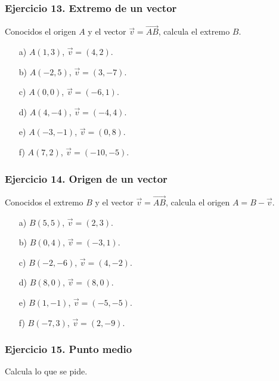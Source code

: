 \subsubsection*{Ejercicio 13. Extremo de un vector}

Conocidos el origen $A$ y el vector $\vec{v}=\overrightarrow{AB}$, calcula el extremo $B$.

\begin{enumerate}
    \item[a)] $A(1,3)$, $\vec{v}=(4,2)$.
    \item[b)] $A(-2,5)$, $\vec{v}=(3,-7)$.
    \item[c)] $A(0,0)$, $\vec{v}=(-6,1)$.
    \item[d)] $A(4,-4)$, $\vec{v}=(-4,4)$.
    \item[e)] $A(-3,-1)$, $\vec{v}=(0,8)$.
    \item[f)] $A(7,2)$, $\vec{v}=(-10,-5)$.
\end{enumerate}

\subsubsection*{Ejercicio 14. Origen de un vector}

Conocidos el extremo $B$ y el vector $\vec{v}=\overrightarrow{AB}$, calcula el origen $A=B-\vec{v}$.

\begin{enumerate}
    \item[a)] $B(5,5)$, $\vec{v}=(2,3)$.
    \item[b)] $B(0,4)$, $\vec{v}=(-3,1)$.
    \item[c)] $B(-2,-6)$, $\vec{v}=(4,-2)$.
    \item[d)] $B(8,0)$, $\vec{v}=(8,0)$.
    \item[e)] $B(1,-1)$, $\vec{v}=(-5,-5)$.
    \item[f)] $B(-7,3)$, $\vec{v}=(2,-9)$.
\end{enumerate}

\subsubsection*{Ejercicio 15. Punto medio}

Calcula lo que se pide.

